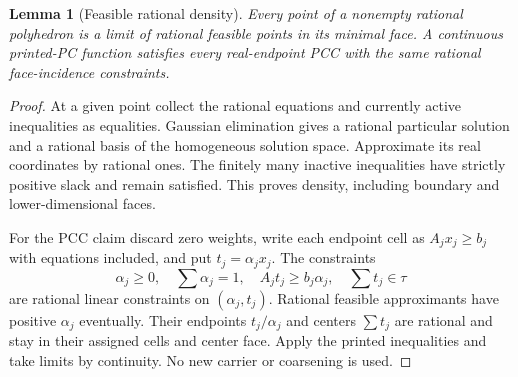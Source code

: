 \documentclass[11pt]{article}
\newtheorem{lemma}[theorem]{Lemma}
\begin{document}
\begin{lemma}[Feasible rational density]\label{lem:density}
Every point of a nonempty rational polyhedron is a limit of rational feasible points in its minimal face. A continuous printed-PC function satisfies every real-endpoint PCC with the same rational face-incidence constraints.
\end{lemma}
\begin{proof}
At a given point collect the rational equations and currently active inequalities as equalities. Gaussian elimination gives a rational particular solution and a rational basis of the homogeneous solution space. Approximate its real coordinates by rational ones. The finitely many inactive inequalities have strictly positive slack and remain satisfied. This proves density, including boundary and lower-dimensional faces.

For the PCC claim discard zero weights, write each endpoint cell as $A_jx_j\geq b_j$ with equations included, and put $t_j=\alpha_jx_j$. The constraints
\[
 \alpha_j\geq0,\quad\sum\alpha_j=1,\quad A_jt_j\geq b_j\alpha_j,\quad\sum t_j\in\tau
\]
are rational linear constraints on $(\alpha_j,t_j)$. Rational feasible approximants have positive $\alpha_j$ eventually. Their endpoints $t_j/\alpha_j$ and centers $\sum t_j$ are rational and stay in their assigned cells and center face. Apply the printed inequalities and take limits by continuity. No new carrier or coarsening is used.
\end{proof}
\end{document}

